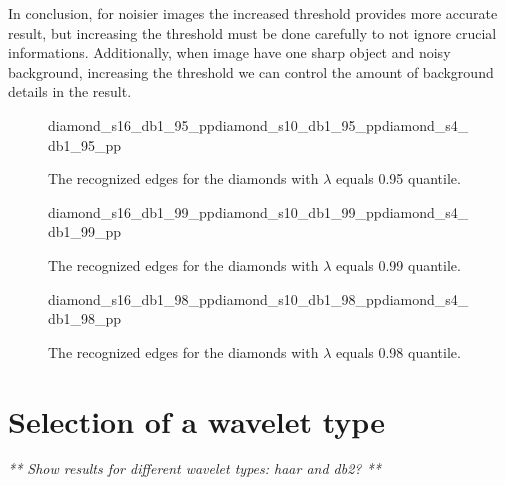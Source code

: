 In conclusion, for noisier images the increased threshold provides more accurate result, but increasing the threshold must be done carefully to not ignore crucial informations. Additionally, when image have one sharp object and noisy background, increasing the threshold we can control the amount of background details in the result.

\begin{figure}[h]
	\begin{subdiagrams3}{diamond_s16_db1_95_pp}{}{diamond_s10_db1_95_pp}{}{diamond_s4_db1_95_pp}{}
	\end{subdiagrams3}
	\centering
	\caption{The recognized edges for the diamonds with $\lambda$ equals 0.95 quantile.}
	\label{fig:diamonds_95}
\end{figure}

\begin{figure}[h]
	\begin{subdiagrams3}{diamond_s16_db1_99_pp}{}{diamond_s10_db1_99_pp}{}{diamond_s4_db1_99_pp}{}
	\end{subdiagrams3}
	\centering
	\caption{The recognized edges for the diamonds with $\lambda$ equals 0.99 quantile.}
	\label{fig:diamonds_99}
\end{figure}

\begin{figure}[h]
	\begin{subdiagrams3}{diamond_s16_db1_98_pp}{}{diamond_s10_db1_98_pp}{}{diamond_s4_db1_98_pp}{}
	\end{subdiagrams3}
	\centering
	\caption{The recognized edges for the diamonds with $\lambda$ equals 0.98 quantile.}
	\label{fig:diamonds_98}
\end{figure}


\section{Selection of a wavelet type}

\textit{** Show results for different wavelet types: haar and db2? **}